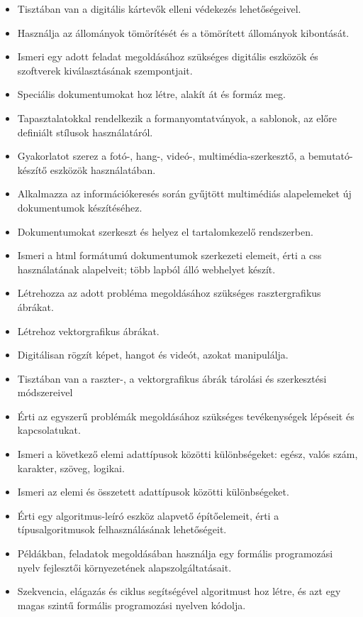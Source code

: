 \begin{itemize}
\item
  Tisztában van a digitális kártevők elleni védekezés lehetőségeivel.
\item
  Használja az állományok tömörítését és a tömörített állományok
  kibontását.
\item
  Ismeri egy adott feladat megoldásához szükséges digitális eszközök és
  szoftverek kiválasztásának szempontjait.
\item
  Speciális dokumentumokat hoz létre, alakít át és formáz meg.
\item
  Tapasztalatokkal rendelkezik a formanyomtatványok, a sablonok, az
  előre definiált stílusok használatáról.
\item
  Gyakorlatot szerez a fotó-, hang-, videó-, multimédia-szerkesztő, a
  bemutató-készítő eszközök használatában.
\item
  Alkalmazza az információkeresés során gyűjtött multimédiás
  alapelemeket új dokumentumok készítéséhez.
\item
  Dokumentumokat szerkeszt és helyez el tartalomkezelő rendszerben.
\item
  Ismeri a html formátumú dokumentumok szerkezeti elemeit, érti a css
  használatának alapelveit; több lapból álló webhelyet készít.
\item
  Létrehozza az adott probléma megoldásához szükséges rasztergrafikus
  ábrákat.
\item
  Létrehoz vektorgrafikus ábrákat.
\item
  Digitálisan rögzít képet, hangot és videót, azokat manipulálja.
\item
  Tisztában van a raszter-, a vektorgrafikus ábrák tárolási és
  szerkesztési módszereivel
\item
  Érti az egyszerű problémák megoldásához szükséges tevékenységek
  lépéseit és kapcsolatukat.
\item
  Ismeri a következő elemi adattípusok közötti különbségeket: egész,
  valós szám, karakter, szöveg, logikai.
\item
  Ismeri az elemi és összetett adattípusok közötti különbségeket.
\item
  Érti egy algoritmus-leíró eszköz alapvető építőelemeit, érti a
  típusalgoritmusok felhasználásának lehetőségeit.
\item
  Példákban, feladatok megoldásában használja egy formális programozási
  nyelv fejlesztői környezetének alapszolgáltatásait.
\item
  Szekvencia, elágazás és ciklus segítségével algoritmust hoz létre, és
  azt egy magas szintű formális programozási nyelven kódolja.

\end{itemize}
